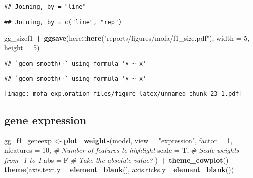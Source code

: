 \documentclass[
]{article}
\newenvironment{Shaded}{\begin{snugshade}}{\end{snugshade}}
\newcommand{\CommentTok}[1]{\textcolor[rgb]{0.56,0.35,0.01}{\textit{#1}}}
\newcommand{\DataTypeTok}[1]{\textcolor[rgb]{0.13,0.29,0.53}{#1}}
\newcommand{\DecValTok}[1]{\textcolor[rgb]{0.00,0.00,0.81}{#1}}
\newcommand{\KeywordTok}[1]{\textcolor[rgb]{0.13,0.29,0.53}{\textbf{#1}}}
\newcommand{\NormalTok}[1]{#1}
\newcommand{\OperatorTok}[1]{\textcolor[rgb]{0.81,0.36,0.00}{\textbf{#1}}}
\newcommand{\StringTok}[1]{\textcolor[rgb]{0.31,0.60,0.02}{#1}}
\begin{document}
\begin{verbatim}
## Joining, by = "line"
\end{verbatim}

\begin{verbatim}
## Joining, by = c("line", "rep")
\end{verbatim}

\begin{Shaded}
\begin{Highlighting}[]
\NormalTok{gg_sizef1 }\OperatorTok{+}\StringTok{ }\KeywordTok{ggsave}\NormalTok{(here}\OperatorTok{::}\KeywordTok{here}\NormalTok{(}\StringTok{"reports/figures/mofa/f1_size.pdf"}\NormalTok{), }\DataTypeTok{width =} \DecValTok{5}\NormalTok{, }\DataTypeTok{height =} \DecValTok{5}\NormalTok{)}
\end{Highlighting}
\end{Shaded}

\begin{verbatim}
## `geom_smooth()` using formula 'y ~ x'
\end{verbatim}

\begin{verbatim}
## `geom_smooth()` using formula 'y ~ x'
\end{verbatim}

\texttt{[image: mofa\_exploration\_files/figure-latex/unnamed-chunk-23-1.pdf]}

\hypertarget{gene-expression}{%
\subsection{gene expression}\label{gene-expression}}

\begin{Shaded}
\begin{Highlighting}[]
\NormalTok{gg_f1_geneexp <-}\StringTok{ }\KeywordTok{plot_weights}\NormalTok{(model,}
  \DataTypeTok{view =} \StringTok{"expression"}\NormalTok{,}
  \DataTypeTok{factor =} \DecValTok{1}\NormalTok{,}
  \DataTypeTok{nfeatures =} \DecValTok{10}\NormalTok{,     }\CommentTok{# Number of features to highlight}
  \DataTypeTok{scale =}\NormalTok{ T,          }\CommentTok{# Scale weights from -1 to 1}
  \DataTypeTok{abs =}\NormalTok{ F             }\CommentTok{# Take the absolute value?}
\NormalTok{) }\OperatorTok{+}\StringTok{ }
\StringTok{  }\KeywordTok{theme_cowplot}\NormalTok{() }\OperatorTok{+}\StringTok{ }
\StringTok{  }\KeywordTok{theme}\NormalTok{(}\DataTypeTok{axis.text.y =} \KeywordTok{element_blank}\NormalTok{(),}
        \DataTypeTok{axis.ticks.y =}\KeywordTok{element_blank}\NormalTok{()) }
\end{Highlighting}
\end{Shaded}
\end{document}
